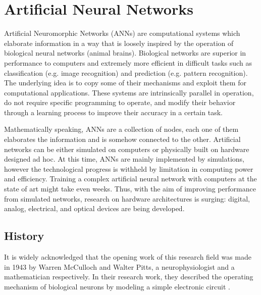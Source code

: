 \chapter{Artificial Neural Networks}
\label{ch:Artificial_Neural_Networks}

Artificial Neuromorphic Networks (ANNs) are computational systems which elaborate information in a way that is loosely inspired by the operation of biological neural networks (animal brains).
Biological networks are superior in performance to computers and extremely more efficient in difficult tasks such as classification (e.g. image recognition) and prediction (e.g. pattern recognition).
The underlying idea is to copy some of their mechanisms and exploit them for computational applications.
These systems are intrinsically parallel in operation, do not require specific programming to operate, and modify their behavior through a learning process to improve their accuracy in a certain task.

Mathematically speaking, ANNs are a collection of nodes, each one of them elaborates the information and is somehow connected to the other.
Artificial networks can be either simulated on computers or physically built on hardware designed ad hoc.
At this time, ANNs are mainly implemented by simulations, however the technological progress is withheld by limitation in computing power and efficiency.
Training a complex artificial neural network with computers at the state of art might take even weeks.
Thus, with the aim of improving performance from simulated networks, research on hardware architectures is surging: digital, analog, electrical, and optical devices are being developed.

\section{History}
\label{sec:History}
It is widely acknowledged that the opening work of this research field was made in 1943 by Warren McCulloch and Walter Pitts, a neurophysiologist and a mathematician respectively.
In their research work, they described the operating mechanism of biological neurons by modeling a simple electronic circuit \cite{McCulloch1943}.

